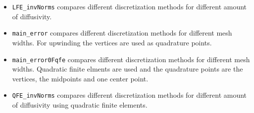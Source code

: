 \begin{itemize}
 \item \texttt{LFE\_invNorms} compares different discretization methods for different amount of diffusivity.
 \item \texttt{main\_error} compares different discretization methods for different mesh widths. For upwinding the vertices are used as quadrature points.
 \item \texttt{main\_error0Fqfe} compares different discretization methods for different mesh widths. Quadratic finite elments are used and the quadrature points are the vertices, the midpoints and one center point.
 \item \texttt{QFE\_invNorms} compares different discretization methods for different amount of diffusivity using quadratic finite elements.
\end{itemize}











